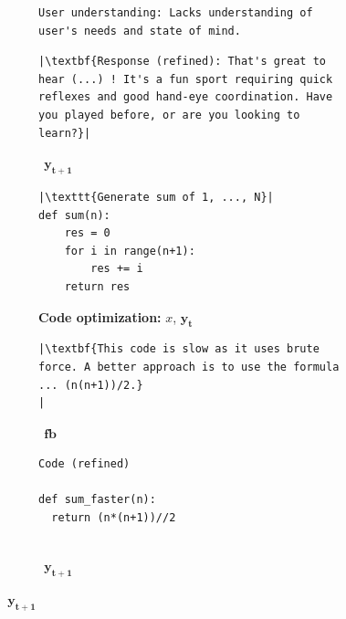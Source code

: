 \begin{figure}[t]
\begin{subfigure}[T]{0.34\textwidth}
\begin{verbatim}
User understanding: Lacks understanding of user's needs and state of mind.
\end{verbatim}
\end{subfigure}
\begin{subfigure}[T]{0.351\textwidth}
\centering
\caption{\textbf{\itermod} $~~\mathbf{y_{t+1}}$}
\label{fig:dialog3}
\begin{verbatim}
|\textbf{Response (refined): That's great to hear (...) ! It's a fun sport requiring quick reflexes and good hand-eye coordination. Have you played before, or are you looking to learn?}|
\end{verbatim}
\end{subfigure}%
\vspace{0.2em}
\begin{subfigure}[T]{0.34\textwidth}
    \centering
    \caption{\textbf{Code optimization:} $x$, $\mathbf{y_{t}}$}
    \label{fig:code1}
    \begin{verbatim}
|\texttt{Generate sum of 1, ..., N}|
def sum(n):
    res = 0
    for i in range(n+1):
        res += i
    return res
    \end{verbatim}
\end{subfigure}%
\hspace{0.025\textwidth}
\vspace{1em}
\begin{subfigure}[T]{0.28\textwidth}
\centering
\caption{\textbf{\fbmod} $~~\mathbf{fb}$}
\label{fig:code2}
\begin{verbatim}
|\textbf{This code is slow as it uses brute force. A better approach is to use the formula ... (n(n+1))/2.}
|
\end{verbatim}
\end{subfigure}
\hspace{0.025\textwidth}
\begin{subfigure}[T]{0.31\textwidth}
    \centering
    \caption{\textbf{\itermod} $~~\mathbf{y_{t+1}}$}
    \label{fig:code3}
    \begin{verbatim}
Code (refined)

def sum_faster(n):
  return (n*(n+1))//2


\end{verbatim}
\end{subfigure}
\end{figure}

